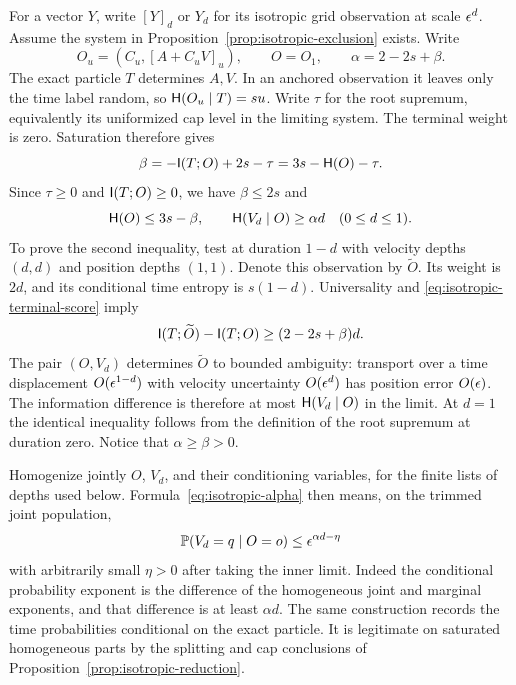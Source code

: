 For a vector $Y$, write $[Y]_d$ or $Y_d$ for its isotropic grid
observation at scale $\epsilon^d$.
Assume the system in Proposition~\ref{prop:isotropic-exclusion} exists. Write
\[
 O_u=(C_u,[A+C_uV]_u),\qquad O=O_1,\qquad
 \alpha=2-2s+\beta.
\]
The exact particle $T$ determines $A,V$. In an anchored observation it leaves
only the time label random, so $\mathsf H(O_u\mid T)=su$. Write $\tau$ for the
root supremum, equivalently its uniformized cap level in the limiting system.
The terminal weight is zero. Saturation therefore gives
\begin{equation}
 \beta=-\mathsf I(T;O)+2s-\tau=3s-\mathsf H(O)-\tau.
 \label{eq:isotropic-terminal-score}
\end{equation}
Since $\tau\geq0$ and $\mathsf I(T;O)\geq0$, we have $\beta\leq2s$ and
\begin{equation}
 \mathsf H(O)\leq3s-\beta,\qquad
 \mathsf H(V_d\mid O)\geq\alpha d\quad(0\leq d\leq1).
 \label{eq:isotropic-alpha}
\end{equation}
To prove the second inequality, test at duration $1-d$ with velocity depths
$(d,d)$ and position depths $(1,1)$. Denote this observation by $\widetilde O$.
Its weight is $2d$, and its conditional time entropy is $s(1-d)$.
Universality and \eqref{eq:isotropic-terminal-score} imply
\[
 \mathsf I(T;\widetilde O)-\mathsf I(T;O)\geq(2-2s+\beta)d.
\]
The pair $(O,V_d)$ determines $\widetilde O$ to bounded ambiguity: transport
over a time displacement $O(\epsilon^{1-d})$ with velocity uncertainty
$O(\epsilon^d)$ has position error $O(\epsilon)$. The information difference is
therefore at most $\mathsf H(V_d\mid O)$ in the limit. At $d=1$ the identical
inequality follows from the definition of the root supremum at duration zero.
Notice that $\alpha\geq\beta>0$.

Homogenize jointly $O$, $V_d$, and their conditioning variables, for the
finite lists of depths used below. Formula~\eqref{eq:isotropic-alpha} then
means, on the trimmed joint population,
\begin{equation}
 \mathbb P(V_d=q\mid O=o)\leq\epsilon^{\alpha d-\eta}
 \label{eq:isotropic-velocity-mass}
\end{equation}
with arbitrarily small $\eta>0$ after taking the inner limit. Indeed the
conditional probability exponent is the difference of the homogeneous
joint and marginal exponents, and that difference is at least $\alpha d$.
The same construction records the time probabilities conditional on the
exact particle. It is legitimate on saturated homogeneous parts by the
splitting and cap conclusions of Proposition~\ref{prop:isotropic-reduction}.

